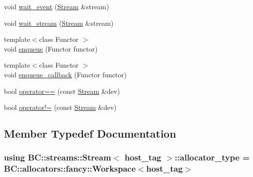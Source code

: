 \begin{DoxyCompactItemize}
\item 
void \hyperlink{classBC_1_1streams_1_1Stream_3_01host__tag_01_4_ad35dc777e2ce7f4ee6cd6497c004d0a5}{wait\+\_\+event} (\hyperlink{classBC_1_1streams_1_1Stream}{Stream} \&stream)
\item 
void \hyperlink{classBC_1_1streams_1_1Stream_3_01host__tag_01_4_a63c03df62ae97fa213857d2c3ff24c38}{wait\+\_\+stream} (\hyperlink{classBC_1_1streams_1_1Stream}{Stream} \&stream)
\item 
{\footnotesize template$<$class Functor $>$ }\\void \hyperlink{classBC_1_1streams_1_1Stream_3_01host__tag_01_4_a59ebe0430788614fbf07f8343db6d85c}{enqueue} (Functor functor)
\item 
{\footnotesize template$<$class Functor $>$ }\\void \hyperlink{classBC_1_1streams_1_1Stream_3_01host__tag_01_4_ab6b9b7025cd387daad40d4b4058764ea}{enqueue\+\_\+callback} (Functor functor)
\item 
bool \hyperlink{classBC_1_1streams_1_1Stream_3_01host__tag_01_4_a95f9b9871170f71b4e9211182af65fe1}{operator==} (const \hyperlink{classBC_1_1streams_1_1Stream}{Stream} \&dev)
\item 
bool \hyperlink{classBC_1_1streams_1_1Stream_3_01host__tag_01_4_a1d3bf0ac0996f7332814a2eda02fb4b0}{operator!=} (const \hyperlink{classBC_1_1streams_1_1Stream}{Stream} \&dev)
\end{DoxyCompactItemize}


\subsection{Member Typedef Documentation}
\subsubsection[{\texorpdfstring{allocator\+\_\+type}{allocator_type}}]{\setlength{\rightskip}{0pt plus 5cm}using {\bf B\+C\+::streams\+::\+Stream}$<$ {\bf host\+\_\+tag} $>$\+::{\bf allocator\+\_\+type} =  {\bf B\+C\+::allocators\+::fancy\+::\+Workspace}$<${\bf host\+\_\+tag}$>$}\hypertarget{classBC_1_1streams_1_1Stream_3_01host__tag_01_4_aefcc1433ff74449a35fbdabb9d1f487c}{}\label{classBC_1_1streams_1_1Stream_3_01host__tag_01_4_aefcc1433ff74449a35fbdabb9d1f487c}
